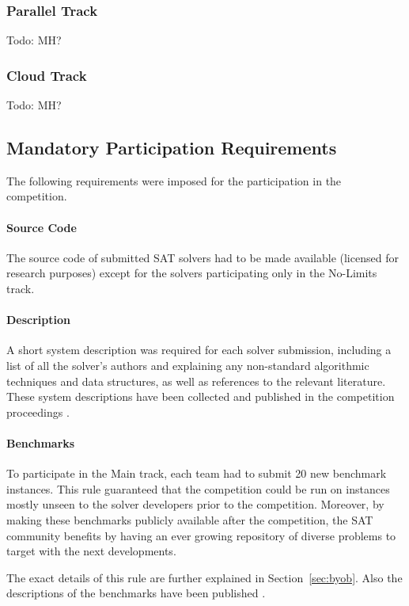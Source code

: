 \documentclass{elsarticle}
\newcommand{\todo}[1]{{\color{purple}Todo: #1}}
\begin{document}
\subsubsection{Parallel Track}

\todo{MH?}

\subsubsection{Cloud Track}

\todo{MH?}

\subsection{Mandatory Participation Requirements}
\label{sec:rules}

The following requirements were imposed for 
the participation in the competition.

\paragraph{Source Code}
The source code of submitted SAT solvers had to be made available 
(licensed for research purposes) except for the solvers participating only in the No-Limits track.

\paragraph{Description}
A short system description was required for each solver submission,
including a list of all the solver's authors and explaining any non-standard algorithmic
techniques and data structures, as well as references to the relevant literature.
These system descriptions have been collected and published in the competition
proceedings \cite{SC2020}.

\paragraph{Benchmarks}
To participate in the Main track, each team had to submit 20 new benchmark instances.
This rule guaranteed that the competition could be run on instances mostly unseen to the solver
developers prior to the competition. Moreover, by making these benchmarks publicly available
after the competition, the SAT community benefits by having an ever growing repository 
of diverse problems to target with the next developments.

The exact details of this rule are further explained in Section~\ref{sec:byob}.
Also the descriptions of the benchmarks have been published \cite{SC2020}.
\end{document}
